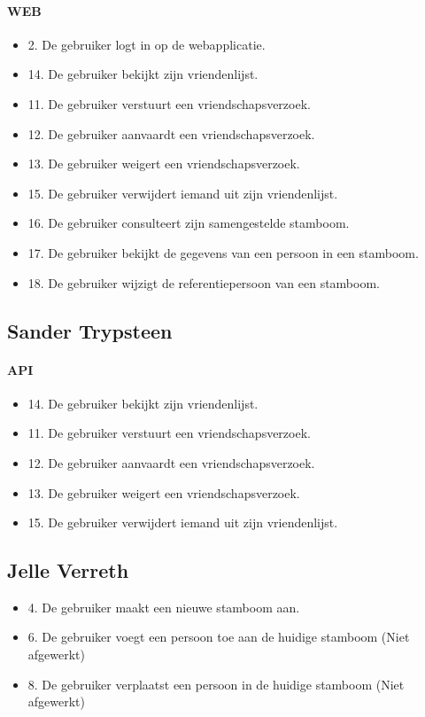 \documentclass[pdftex,a4paper,12pt,twoside]{report}
\begin{document}
\paragraph{WEB}
\begin{itemize}
\item 2. De gebruiker logt in op de webapplicatie.
\item 14. De gebruiker bekijkt zijn vriendenlijst.
\item 11. De gebruiker verstuurt een vriendschapsverzoek.
\item 12. De gebruiker aanvaardt een vriendschapsverzoek.
\item 13. De gebruiker weigert een vriendschapsverzoek.
\item 15. De gebruiker verwijdert iemand uit zijn vriendenlijst.
\item 16. De gebruiker consulteert zijn samengestelde stamboom.
\item 17. De gebruiker bekijkt de gegevens van een persoon in een stamboom.
\item 18. De gebruiker wijzigt de referentiepersoon van een stamboom.
\end{itemize}
\subsection{Sander Trypsteen}
\paragraph{API}
\begin{itemize}
\item 14. De gebruiker bekijkt zijn vriendenlijst.
\item 11. De gebruiker verstuurt een vriendschapsverzoek.
\item 12. De gebruiker aanvaardt een vriendschapsverzoek.
\item 13. De gebruiker weigert een vriendschapsverzoek.
\item 15. De gebruiker verwijdert iemand uit zijn vriendenlijst.
\end{itemize}
\subsection{Jelle Verreth}
\begin{itemize}
\item 4. De gebruiker maakt een nieuwe stamboom aan.
\item 6. De gebruiker voegt een persoon toe aan de huidige stamboom 
(Niet afgewerkt)
\item 8. De gebruiker verplaatst een persoon in de huidige stamboom 
(Niet afgewerkt)
\end{itemize}
\end{document}
